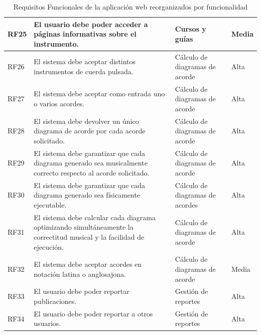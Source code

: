 \begin{table}[H]
\begin{tabular}{l p{} p{} l}
        RF25 & El usuario debe poder acceder a páginas informativas sobre el instrumento. & Cursos y guías & Media \\ \hline

        RF26 & El sistema debe aceptar distintos instrumentos de cuerda pulsada. & Cálculo de diagramas de acorde & Alta \\ \hline

        RF27 & El sistema debe aceptar como entrada uno o varios acordes. & Cálculo de diagramas de acorde & Alta \\ \hline

        RF28 & El sistema debe devolver un único diagrama de acorde por cada acorde solicitado. & Cálculo de diagramas de acorde & Alta \\ \hline

        RF29 & El sistema debe garantizar que cada diagrama generado sea musicalmente correcto respecto al acorde solicitado. & Cálculo de diagramas de acorde & Alta \\ \hline

        RF30 & El sistema debe garantizar que cada diagrama generado sea físicamente ejecutable. & Cálculo de diagramas de acordes & Alta \\ \hline

        RF31 & El sistema debe calcular cada diagrama optimizando simultáneamente la correctitud musical y la facilidad de ejecución. & Cálculo de diagramas de acorde & Alta \\ \hline

        RF32 & El sistema debe aceptar acordes en notación latina o anglosajona. & Cálculo de diagramas de acorde & Media \\ \hline
        
        RF33 & El usuario debe poder reportar publicaciones. & Gestión de reportes & Alta \\ \hline

        RF34 & El usuario debe poder reportar a otros usuarios. & Gestión de reportes & Alta \\ \hline
       
    \end{tabular}
    \caption{Requisitos Funcionales de la aplicación web reorganizados por funcionalidad}\label{tab:requisitosfuncionales}
\end{table}


